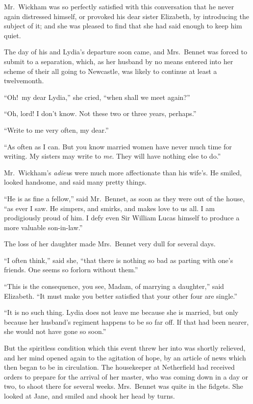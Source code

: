 \documentclass[12pt,english,oneside]{book}
\begin{document}


Mr.\ Wickham was so perfectly satisfied with this conversation that
he never again distressed himself, or provoked his dear sister Elizabeth,
by introducing the subject of it; and she was pleased to find that
she had said enough to keep him quiet.

The day of his and Lydia's departure soon came, and Mrs.\ Bennet
was forced to submit to a separation, which, as her husband by no
means entered into her scheme of their all going to Newcastle, was
likely to continue at least a twelvemonth.

{}``Oh!\ my dear Lydia,'' she cried, {}``when shall we meet again?''\ 

{}``Oh, lord! I don't know. Not these two or three years, perhaps.''

{}``Write to me very often, my dear.''

{}``As often as I can. But you know married women have never much
time for writing. My sisters may write to \textit{me}. They will have
nothing else to do.''

Mr.\ Wickham's \emph{adieu}s were much more affectionate than his
wife's. He smiled, looked handsome, and said many pretty things.

{}``He is as fine a fellow,'' said Mr.\ Bennet, as soon as they
were out of the house, {}``as ever I saw. He simpers, and smirks,
and makes love to us all. I am prodigiously proud of him. I defy even
Sir William Lucas himself to produce a more valuable son-in-law.''

The loss of her daughter made Mrs.\ Bennet very dull for several
days.

{}``I often think,'' said she, {}``that there is nothing so bad
as parting with one's friends. One seems so forlorn without them.''

{}``This is the consequence, you see, Madam, of marrying a daughter,''
said Elizabeth. {}``It must make you better satisfied that your other
four are single.''

{}``It is no such thing. Lydia does not leave me because she is married,
but only because her husband's regiment happens to be so far off.
If that had been nearer, she would not have gone so soon.''

But the spiritless condition which this event threw her into was shortly
relieved, and her mind opened again to the agitation of hope, by an
article of news which then began to be in circulation. The housekeeper
at Netherfield had received orders to prepare for the arrival of her
master, who was coming down in a day or two, to shoot there for several
weeks. Mrs.\ Bennet was quite in the fidgets. She looked at Jane,
and smiled and shook her head by turns.
\end{document}
